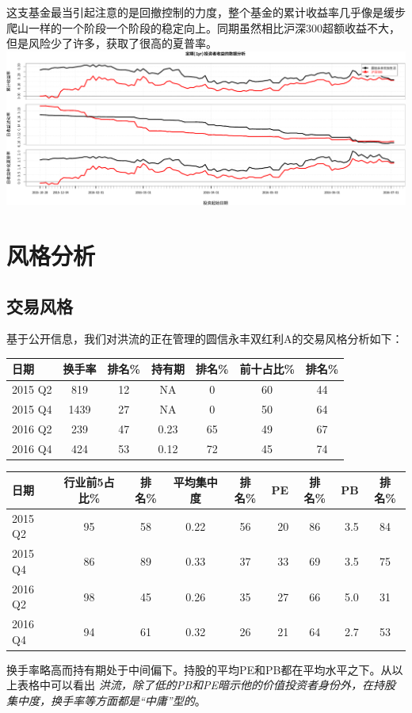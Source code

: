 \documentclass[hyperref,]{ctexart}
\begin{document}
这支基金最当引起注意的是回撤控制的力度，整个基金的累计收益率几乎像是缓步爬山一样的一个阶段一个阶段的稳定向上。同期虽然相比沪深300超额收益不大，但是风险少了许多，获取了很高的夏普率。
\includegraphics{hongliu-details_files/figure-latex/unnamed-chunk-5-1.pdf}

\section{风格分析}

\subsection{交易风格}

基于公开信息，我们对洪流的正在管理的圆信永丰双红利A的交易风格分析如下：

\begin{longtable}[]{@{}lcccccc@{}}
\toprule
日期 & 换手率 & 排名\% & 持有期 & 排名\% & 前十占比\% &
排名\%\tabularnewline
\midrule
\endhead
2015 Q2 & 819 & 12 & NA & 0 & 60 & 44\tabularnewline
2015 Q4 & 1439 & 27 & NA & 0 & 50 & 64\tabularnewline
2016 Q2 & 239 & 47 & 0.23 & 65 & 49 & 67\tabularnewline
2016 Q4 & 424 & 53 & 0.12 & 72 & 45 & 74\tabularnewline
\bottomrule
\end{longtable}

\begin{longtable}[]{@{}lccccrcrc@{}}
\toprule
日期 & 行业前5占比\% & 排名\% & 平均集中度 & 排名\% & PE & 排名\% & PB &
排名\%\tabularnewline
\midrule
\endhead
2015 Q2 & 95 & 58 & 0.22 & 56 & 20 & 86 & 3.5 & 84\tabularnewline
2015 Q4 & 86 & 89 & 0.33 & 37 & 33 & 69 & 3.5 & 75\tabularnewline
2016 Q2 & 98 & 45 & 0.26 & 35 & 27 & 66 & 5.0 & 31\tabularnewline
2016 Q4 & 94 & 61 & 0.32 & 26 & 21 & 64 & 2.7 & 53\tabularnewline
\bottomrule
\end{longtable}

换手率略高而持有期处于中间偏下。持股的平均PE和PB都在平均水平之下。从以上表格中可以看出
\emph{洪流，除了低的PB和PE暗示他的价值投资者身份外，在持股集中度，换手率等方面都是``中庸''型的}。
\end{document}
